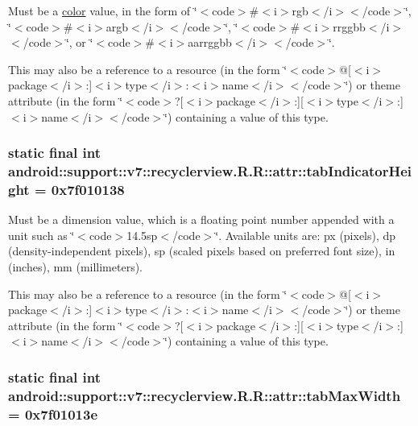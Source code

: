 Must be a \hyperlink{classandroid_1_1support_1_1v7_1_1recyclerview_1_1_r_1_1color}{color} value, in the form of \char`\"{}$<$code$>$\#$<$i$>$rgb$<$/i$>$$<$/code$>$\char`\"{}, \char`\"{}$<$code$>$\#$<$i$>$argb$<$/i$>$$<$/code$>$\char`\"{}, \char`\"{}$<$code$>$\#$<$i$>$rrggbb$<$/i$>$$<$/code$>$\char`\"{}, or \char`\"{}$<$code$>$\#$<$i$>$aarrggbb$<$/i$>$$<$/code$>$\char`\"{}. 

This may also be a reference to a resource (in the form \char`\"{}$<$code$>$@\mbox{[}$<$i$>$package$<$/i$>$:\mbox{]}$<$i$>$type$<$/i$>$:$<$i$>$name$<$/i$>$$<$/code$>$\char`\"{}) or theme attribute (in the form \char`\"{}$<$code$>$?\mbox{[}$<$i$>$package$<$/i$>$:\mbox{]}\mbox{[}$<$i$>$type$<$/i$>$:\mbox{]}$<$i$>$name$<$/i$>$$<$/code$>$\char`\"{}) containing a value of this type. \hypertarget{classandroid_1_1support_1_1v7_1_1recyclerview_1_1_r_1_1attr_8a631f4526c6055ca3116afdb50db458}{
\subsubsection[{tabIndicatorHeight}]{\setlength{\rightskip}{0pt plus 5cm}static final int android::support::v7::recyclerview.R.R::attr::tabIndicatorHeight = 0x7f010138}}
\label{classandroid_1_1support_1_1v7_1_1recyclerview_1_1_r_1_1attr_8a631f4526c6055ca3116afdb50db458}


Must be a dimension value, which is a floating point number appended with a unit such as \char`\"{}$<$code$>$14.5sp$<$/code$>$\char`\"{}. Available units are: px (pixels), dp (density-independent pixels), sp (scaled pixels based on preferred font size), in (inches), mm (millimeters). 

This may also be a reference to a resource (in the form \char`\"{}$<$code$>$@\mbox{[}$<$i$>$package$<$/i$>$:\mbox{]}$<$i$>$type$<$/i$>$:$<$i$>$name$<$/i$>$$<$/code$>$\char`\"{}) or theme attribute (in the form \char`\"{}$<$code$>$?\mbox{[}$<$i$>$package$<$/i$>$:\mbox{]}\mbox{[}$<$i$>$type$<$/i$>$:\mbox{]}$<$i$>$name$<$/i$>$$<$/code$>$\char`\"{}) containing a value of this type. \hypertarget{classandroid_1_1support_1_1v7_1_1recyclerview_1_1_r_1_1attr_f9a5ffa715ad4b20ff536ba7b614279d}{
\subsubsection[{tabMaxWidth}]{\setlength{\rightskip}{0pt plus 5cm}static final int android::support::v7::recyclerview.R.R::attr::tabMaxWidth = 0x7f01013e}}
\label{classandroid_1_1support_1_1v7_1_1recyclerview_1_1_r_1_1attr_f9a5ffa715ad4b20ff536ba7b614279d}



